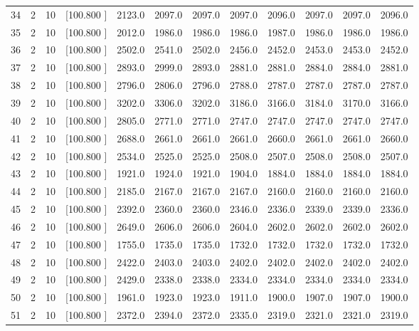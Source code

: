 \documentclass[12pt,a4paper]{article}
\begin{document}
\begin{center}
{\begin{tabular}{r r r r r r r r r r r r}
  34&  2& 10&[100.800   ]&  2123.0&  2097.0&  2097.0&  2097.0&  2096.0&  2097.0&  2097.0&  2096.0\\[-0.02in]
  35&  2& 10&[100.800   ]&  2012.0&  1986.0&  1986.0&  1986.0&  1987.0&  1986.0&  1986.0&  1986.0\\[-0.02in]
  36&  2& 10&[100.800   ]&  2502.0&  2541.0&  2502.0&  2456.0&  2452.0&  2453.0&  2453.0&  2452.0\\[-0.02in]
  37&  2& 10&[100.800   ]&  2893.0&  2999.0&  2893.0&  2881.0&  2881.0&  2884.0&  2884.0&  2881.0\\[-0.02in]
  38&  2& 10&[100.800   ]&  2796.0&  2806.0&  2796.0&  2788.0&  2787.0&  2787.0&  2787.0&  2787.0\\[-0.02in]
  39&  2& 10&[100.800   ]&  3202.0&  3306.0&  3202.0&  3186.0&  3166.0&  3184.0&  3170.0&  3166.0\\[-0.02in]
  40&  2& 10&[100.800   ]&  2805.0&  2771.0&  2771.0&  2747.0&  2747.0&  2747.0&  2747.0&  2747.0\\[-0.02in]
  41&  2& 10&[100.800   ]&  2688.0&  2661.0&  2661.0&  2661.0&  2660.0&  2661.0&  2661.0&  2660.0\\[-0.02in]
  42&  2& 10&[100.800   ]&  2534.0&  2525.0&  2525.0&  2508.0&  2507.0&  2508.0&  2508.0&  2507.0\\[-0.02in]
  43&  2& 10&[100.800   ]&  1921.0&  1924.0&  1921.0&  1904.0&  1884.0&  1884.0&  1884.0&  1884.0\\[-0.02in]
  44&  2& 10&[100.800   ]&  2185.0&  2167.0&  2167.0&  2167.0&  2160.0&  2160.0&  2160.0&  2160.0\\[-0.02in]
  45&  2& 10&[100.800   ]&  2392.0&  2360.0&  2360.0&  2346.0&  2336.0&  2339.0&  2339.0&  2336.0\\[-0.02in]
  46&  2& 10&[100.800   ]&  2649.0&  2606.0&  2606.0&  2604.0&  2602.0&  2602.0&  2602.0&  2602.0\\[-0.02in]
  47&  2& 10&[100.800   ]&  1755.0&  1735.0&  1735.0&  1732.0&  1732.0&  1732.0&  1732.0&  1732.0\\[-0.02in]
  48&  2& 10&[100.800   ]&  2422.0&  2403.0&  2403.0&  2402.0&  2402.0&  2402.0&  2402.0&  2402.0\\[-0.02in]
  49&  2& 10&[100.800   ]&  2429.0&  2338.0&  2338.0&  2334.0&  2334.0&  2334.0&  2334.0&  2334.0\\[-0.02in]
  50&  2& 10&[100.800   ]&  1961.0&  1923.0&  1923.0&  1911.0&  1900.0&  1907.0&  1907.0&  1900.0\\[-0.02in]
  51&  2& 10&[100.800   ]&  2372.0&  2394.0&  2372.0&  2335.0&  2319.0&  2321.0&  2321.0&  2319.0\\[-0.02in]

\end{tabular}}
\end{center}
\end{document}
